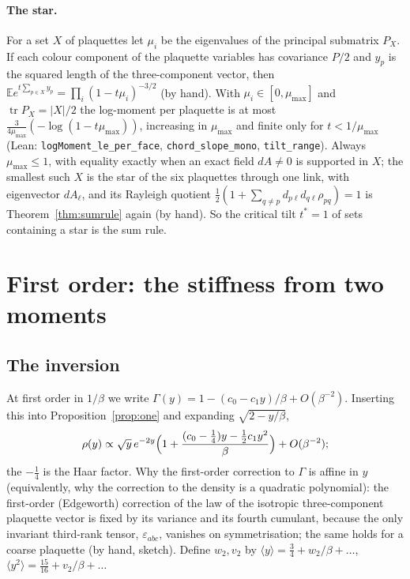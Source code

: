 \documentclass[11pt,a4paper]{article}
\theoremstyle{definition}
\theoremstyle{remark}
\newcommand{\E}{\mathbb{E}}
\newcommand{\code}[1]{\texttt{#1}}
\begin{document}
\paragraph{The star.} For a set $X$ of plaquettes let $\mu_i$ be the eigenvalues of the principal submatrix $P_X$. If each colour component of the plaquette variables has covariance $P/2$ and $y_p$ is the squared length of the three-component vector, then $\E e^{t\sum_{p\in X}y_p}=\prod_i(1-t\mu_i)^{-3/2}$ (by hand). With $\mu_i\in[0,\mu_{\max}]$ and $\operatorname{tr}P_X=|X|/2$ the log-moment per plaquette is at most $\frac{3}{4\mu_{\max}}(-\log(1-t\mu_{\max}))$, increasing in $\mu_{\max}$ and finite only for $t<1/\mu_{\max}$ (Lean: \code{logMoment\_le\_per\_face}, \code{chord\_slope\_mono}, \code{tilt\_range}). Always $\mu_{\max}\le1$, with equality exactly when an exact field $dA\ne0$ is supported in $X$; the smallest such $X$ is the star of the six plaquettes through one link, with eigenvector $dA_\ell$, and its Rayleigh quotient $\tfrac12(1+\sum_{q\ne p}d_{p\ell}d_{q\ell}\rho_{pq})=1$ is Theorem~\ref{thm:sumrule} again (by hand). So the critical tilt $t^*=1$ of sets containing a star is the sum rule.

\section{First order: the stiffness from two moments}\label{sec:first}

\subsection{The inversion}

At first order in $1/\beta$ we write $\Gamma(y)=1-(c_0-c_1y)/\beta+O(\beta^{-2})$. Inserting this into Proposition~\ref{prop:one} and expanding $\sqrt{2-y/\beta}$,
\[
\rho(y)\propto\sqrt y\,e^{-2y}\Bigl(1+\frac{(c_0-\frac14)y-\frac12c_1y^2}{\beta}\Bigr)+O(\beta^{-2});
\]
the $-\tfrac14$ is the Haar factor. Why the first-order correction to $\Gamma$ is affine in $y$ (equivalently, why the correction to the density is a quadratic polynomial): the first-order (Edgeworth) correction of the law of the isotropic three-component plaquette vector is fixed by its variance and its fourth cumulant, because the only invariant third-rank tensor, $\varepsilon_{abc}$, vanishes on symmetrisation; the same holds for a coarse plaquette (by hand, sketch). Define $w_2,v_2$ by $\langle y\rangle=\tfrac34+w_2/\beta+\dots$, $\langle y^2\rangle=\tfrac{15}{16}+v_2/\beta+\dots$
\end{document}
